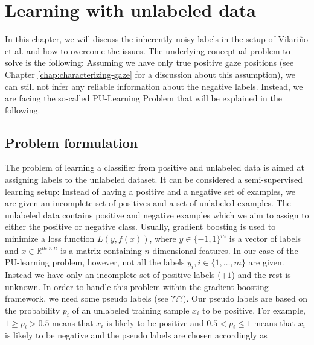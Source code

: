 \chapter{Learning with unlabeled data}
\label{chap:learning-with-unlabeled-data}
In this chapter, we will discuss the inherently noisy labels in the setup of Vilari\~no et al. and how to overcome the issues. 
The underlying conceptual problem to solve is the following: Assuming we have only true positive gaze positions (see Chapter \ref{chap:characterizing-gaze} for a discussion about this assumption), we can still not infer any reliable information about the negative labels. Instead, we are facing the so-called PU-Learning Problem that will be explained in the following.

\section{Problem formulation}
The problem of learning a classifier from positive and unlabeled data is aimed at assigning labels to the unlabeled dataset. 
It can be considered a semi-supervised learning setup: Instead of having a positive and a negative set of examples, we are given an incomplete set of positives and a set of unlabeled examples. 
The unlabeled data contains positive and negative examples which we aim to assign to either the positive or negative class. 
Usually, gradient boosting is used to minimize a loss function $L(y,f(x))$, where $y \in \{-1,1\}^m$ is a vector of labels and $x \in \mathbb{R}^{m\times n}$ is a matrix containing $n$-dimensional features. In our case of the PU-learning problem, however, not all the labels $y_i, i \in \{1,\dots,m\}$ are given. 
Instead we have only an incomplete set of positive labels ($+1$) and the rest is unknown. In order to handle this problem within the gradient boosting framework, we need some pseudo labels (see ???). Our pseudo labels are based on the probability $p_i$ of an unlabeled training sample $x_i$ to be positive. For example, $1 \geq p_i > 0.5$ means that $x_i$ is likely to be positive and $0.5 < p_i \leq 1$ means that $x_i$ is likely to be negative and the pseudo labels are chosen accordingly as
